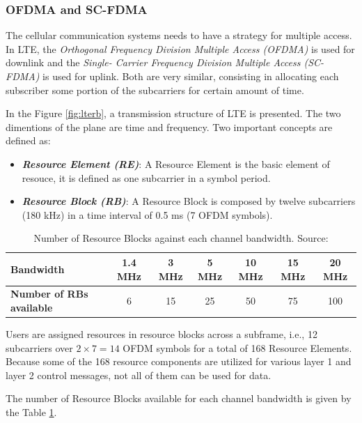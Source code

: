 \subsubsection{OFDMA and SC-FDMA}
The cellular communication systems needs to have a strategy for multiple access. In LTE, the 
\textit{Orthogonal Frequency Division Multiple Access (OFDMA)} is used for downlink and the \textit{Single-
Carrier Frequency Division Multiple Access (SC-FDMA)} is used for uplink. Both are very similar, consisting
in allocating each subscriber some portion of the subcarriers for certain amount of time.

In the Figure \ref{fig:lterb}, a transmission structure of LTE is presented. The two dimentions of the 
plane are time and frequency. Two important concepts are defined as:

\begin{itemize}
  \item \textbf{\textit{Resource Element (RE)}}: A Resource Element is the basic element of resouce, it is
  defined as one subcarrier in a symbol period.
  \item \textbf{\textit{Resource Block (RB)}}: A Resource Block is composed by twelve subcarriers (180 kHz) in 
  a time interval of 0.5 ms (7 OFDM symbols).
\end{itemize}

\begin{table}[]
  \centering
  \begin{tabular}{@{}lcccccc@{}}
  \toprule
  \textbf{Bandwidth}               & 1.4 MHz & 3 MHz & 5 MHz & 10 MHz & 15 MHz & 20 MHz \\ \midrule
  \textbf{Number of RBs available} & 6       & 15    & 25    & 50     & 75     & 100    \\ \bottomrule
  \end{tabular}
  \caption{Number of Resource Blocks against each channel bandwidth. Source: \cite{ofdma1}}
  \label{table:rb}
\end{table}

Users are assigned resources in resource blocks across a subframe, i.e., 12 subcarriers over ${2\times7 = 14}$
OFDM symbols for a total of 168 Resource Elements. Because some of the 168 resource components are utilized 
for various layer 1 and layer 2 control messages, not all of them can be used for data.

The number of Resource Blocks available for each channel bandwidth is given by the Table \ref{table:rb}. 

